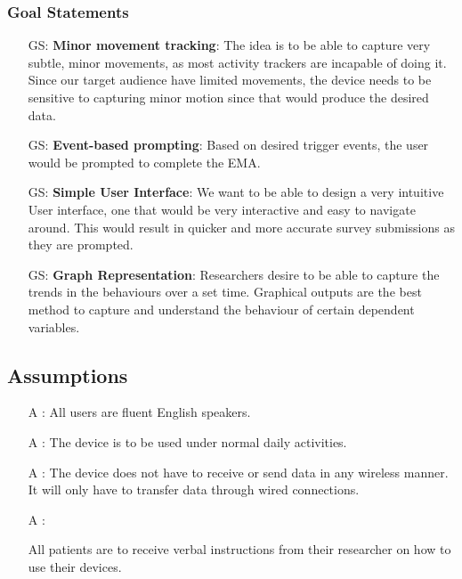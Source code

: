 \documentclass[12pt]{article}
\newcounter{assumpnum} %
\newcounter{goalnum} %
\begin{document}
\subsubsection{Goal Statements}
\begin{itemize}

  \item[GS\refstepcounter{goalnum}\thegoalnum \label{G_meaningfulLabel}:] \textbf{Minor movement tracking}: The idea is to be able to capture very subtle, minor movements, as most activity trackers are incapable of doing it. Since our target audience have limited movements, the device needs to be sensitive to capturing minor motion since that would produce the desired data.
  \item[GS\refstepcounter{goalnum}\thegoalnum \label{G_meaningfulLabel}:] \textbf{Event-based prompting}: Based on desired trigger events, the user would be prompted to complete the EMA.
  \item[GS\refstepcounter{goalnum}\thegoalnum \label{G_meaningfulLabel}:] \textbf{Simple User Interface}: We want to be able to design a very intuitive User interface, one that would be very interactive and easy to navigate around. This would result in quicker and more accurate survey submissions as they are prompted.
  \item[GS\refstepcounter{goalnum}\thegoalnum \label{G_meaningfulLabel}:] \textbf{Graph Representation}: Researchers desire to be able to capture the trends in the behaviours over a set time. Graphical outputs are the best method to capture and understand the behaviour of certain dependent variables.

\end{itemize}

\subsection{Assumptions}%

\begin{itemize}

\item[A\refstepcounter{assumpnum}\theassumpnum
\label{A_meaningfulLabel}:]
{All users are fluent English speakers.}

\item[A\refstepcounter{assumpnum}\theassumpnum
\label{A_meaningfulLabel}:]
{The device is to be used under normal daily activities.}

\item[A\refstepcounter{assumpnum}\theassumpnum
\label{A_meaningfulLabel}:]
{The device does not have to receive or send data in any wireless manner. It will only have to transfer data through wired connections.}

\item[A\refstepcounter{assumpnum}\theassumpnum
\label{A_meaningfulLabel}:]

{All patients are to receive verbal instructions from their researcher on how to use their devices.}

\end{itemize}
\end{document}
